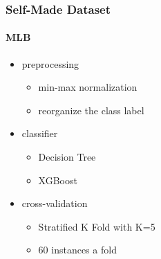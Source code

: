 \documentclass[
	11pt, %
	aspectratio=169, %
]{beamer}
\begin{document}
\begin{frame}
	\frametitle{Self-Made Dataset}
	\framesubtitle{MLB}

	\begin{itemize}
		\item preprocessing
		\begin{itemize}
			\item min-max normalization
			\item reorganize the class label
		\end{itemize}
		\item classifier
		\begin{itemize}
			\item Decision Tree
			\item XGBoost
		\end{itemize}
		\item cross-validation
		\begin{itemize}
			\item Stratified K Fold with K=5
			\item 60 instances a fold
		\end{itemize}
	\end{itemize}
\end{frame}
\end{document}
